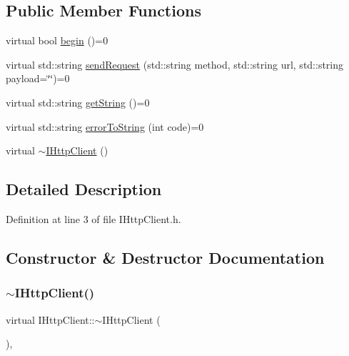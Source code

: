 \subsection*{Public Member Functions}
\begin{DoxyCompactItemize}
\item 
virtual bool \hyperlink{class_i_http_client_a8975ccaf71b99eef3f85f86a56878d93}{begin} ()=0
\item 
virtual std\+::string \hyperlink{class_i_http_client_accb015ba9ef2b7963f13094297d97073}{send\+Request} (std\+::string method, std\+::string url, std\+::string payload=\char`\"{}\char`\"{})=0
\item 
virtual std\+::string \hyperlink{class_i_http_client_a3bf91f2161617983a11228fdc69298b8}{get\+String} ()=0
\item 
virtual std\+::string \hyperlink{class_i_http_client_a7e7b1f6846e06a81242fbfdb2e328016}{error\+To\+String} (int code)=0
\item 
virtual \hyperlink{class_i_http_client_aef297654dd90d97a49d51d70c65940e5}{$\sim$\+I\+Http\+Client} ()
\end{DoxyCompactItemize}


\subsection{Detailed Description}


Definition at line 3 of file I\+Http\+Client.\+h.



\subsection{Constructor \& Destructor Documentation}
\mbox{\label{class_i_http_client_aef297654dd90d97a49d51d70c65940e5}} 
\subsubsection{\texorpdfstring{$\sim$\+I\+Http\+Client()}{~IHttpClient()}}
{\footnotesize\ttfamily virtual I\+Http\+Client\+::$\sim$\+I\+Http\+Client (\begin{DoxyParamCaption}{ }\end{DoxyParamCaption})\hspace{0.3cm}{\ttfamily [inline]}, {\ttfamily [virtual]}}



